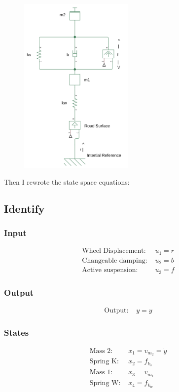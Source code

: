\documentclass{article}
\begin{document}
\begin{figure}[H]
    \centering
    \includegraphics[width=0.5\textwidth]{activeSusModel.png}
\end{figure}

Then I rewrote the state space equations:

\subsection{Identify}
\subsubsection{Input}
\begin{align*}
\text{Wheel Displacement: } & u_1 = r \\
\text{Changeable damping: } & u_2 = b \\
\text{Active suspension: } & u_3 = f
\end{align*}

\subsubsection{Output}
\begin{align*}
\text{Output: } & y = y
\end{align*}

\subsubsection{States}
\begin{align*}
\text{Mass 2: } & x_1 = v_{m_2} = \dot{y} \\
\text{Spring K: } & x_2 = f_{k_s} \\
\text{Mass 1: } & x_3 = v_{m_1} \\
\text{Spring W: } & x_4 = f_{k_w}
\end{align*}
\end{document}
